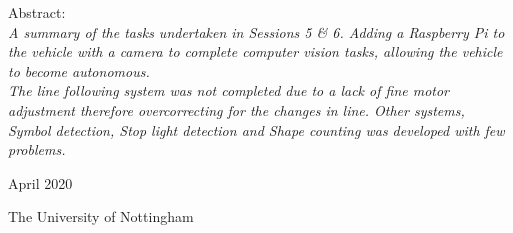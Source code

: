 \begin{titlepage}
	Abstract: \\
	\textit{A summary of the tasks undertaken in Sessions 5 \& 6. Adding a Raspberry Pi to the vehicle with a camera to complete computer vision tasks, allowing the vehicle to become autonomous. \\ The line following system was not completed due to a lack of fine motor adjustment therefore overcorrecting for the changes in line. Other systems, Symbol detection, Stop light detection and Shape counting was developed with few problems.   
	}	
	
	\vfill %

	
	
	
	
	\vspace{0.3\baselineskip} %
	
	April 2020 %
	
	{\large The University of Nottingham} %

\end{titlepage}